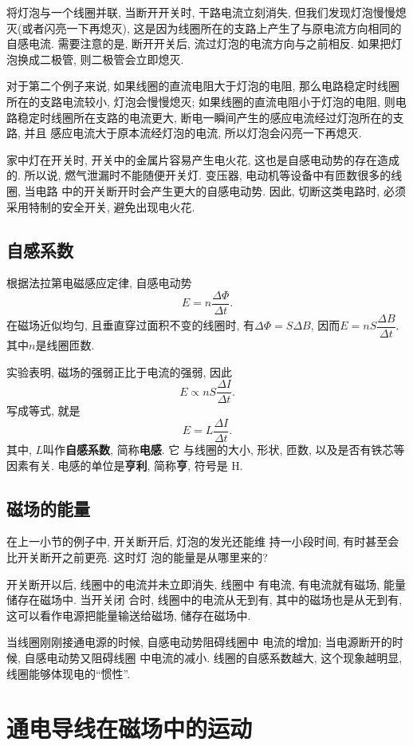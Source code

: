 \documentclass[11pt,a4paper]{ctexbook}
\begin{document}
将灯泡与一个线圈并联, 当断开开关时, 干路电流立刻消失, 但我们发现灯泡慢慢熄灭(或者闪亮一下再熄灭), 这是因为线圈所在的支路上产生了与原电流方向相同的自感电流.
需要注意的是, 断开开关后, 流过灯泡的电流方向与之前相反. 如果把灯泡换成二极管, 则二极管会立即熄灭.

对于第二个例子来说, 如果线圈的直流电阻大于灯泡的电阻, 那么电路稳定时线圈所在的支路电流较小, 灯泡会慢慢熄灭;
如果线圈的直流电阻小于灯泡的电阻, 则电路稳定时线圈所在支路的电流更大, 断电一瞬间产生的感应电流经过灯泡所在的支路, 并且
感应电流大于原本流经灯泡的电流, 所以灯泡会闪亮一下再熄灭.

家中灯在开关时, 开关中的金属片容易产生电火花, 这也是自感电动势的存在造成的.
所以说, 燃气泄漏时不能随便开关灯.
变压器, 电动机等设备中有匝数很多的线圈, 当电路
中的开关断开时会产生更大的自感电动势. 因此, 切断这类电路时, 必须采用特制的安全开关,
避免出现电火花.

\subsection{自感系数}

根据法拉第电磁感应定律, 自感电动势$$E = n\frac {\Delta \Phi}{\Delta t}.$$
在磁场近似均匀, 且垂直穿过面积不变的线圈时, 有$\Delta\Phi=S\Delta B$, 因而$E = nS\dfrac{\Delta B}{\Delta t}$. 其中$n$是线圈匝数.

实验表明, 磁场的强弱正比于电流的强弱, 因此
$$E \propto nS\frac{\Delta I}{\Delta t}.$$
写成等式, 就是
$$E = L \frac{\Delta I}{\Delta t}.$$
其中, $L$叫作\textbf{自感系数}, 简称\textbf{电感}. 它
与线圈的大小, 形状, 匝数, 以及是否有铁芯等因素有关.
电感的单位是\textbf{亨利}, 简称\textbf{亨}, 符号是 H.

\subsection{磁场的能量}

在上一小节的例子中, 开关断开后, 灯泡的发光还能维
持一小段时间, 有时甚至会比开关断开之前更亮. 这时灯
泡的能量是从哪里来的?

开关断开以后, 线圈中的电流并未立即消失, 线圈中
有电流, 有电流就有磁场, 能量储存在磁场中. 当开关闭
合时, 线圈中的电流从无到有, 其中的磁场也是从无到有,
这可以看作电源把能量输送给磁场, 储存在磁场中.

当线圈刚刚接通电源的时候, 自感电动势阻碍线圈中
电流的增加; 当电源断开的时候, 自感电动势又阻碍线圈
中电流的减小. 线圈的自感系数越大, 这个现象越明显,
线圈能够体现电的``惯性''.

\section{通电导线在磁场中的运动}
\label{切割磁感线一节}
\end{document}
